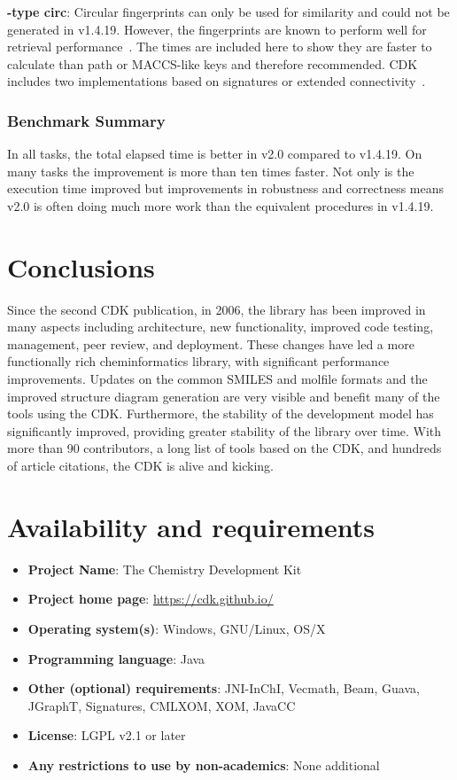 \documentclass[doublespacing]{bmcart}
\def \cdkversion {v2.0}
\begin{document}
\textbf{-type circ}: Circular fingerprints can only be used for similarity and
could not be generated in v1.4.19. However, the fingerprints are known to perform
well for retrieval performance~\cite{OBoyle2016}. The times are included here 
to show they are faster to calculate than path or MACCS-like keys and therefore
recommended. CDK includes two implementations based on signatures or extended 
connectivity~\cite{Clark2014}.

\subsubsection*{Benchmark Summary}

In all tasks, the total elapsed time is better in \cdkversion{} compared to 
v1.4.19. On many tasks the improvement is more than ten times faster.
Not only is the execution time improved but improvements in robustness and 
correctness means \cdkversion{} is often doing much more work than the 
equivalent procedures in v1.4.19.

\section*{Conclusions}

Since the second CDK publication, in 2006, the library has been improved
in many aspects including architecture, new functionality, improved
code testing, management, peer review, and deployment. These changes have led a more
functionally rich cheminformatics library, with significant
performance improvements. Updates on the common SMILES and molfile
formats and the improved structure diagram generation are very visible
and benefit many of the tools using the CDK.  Furthermore, the
stability of the development model has significantly improved,
providing greater stability of the library over time.
With more than 90 contributors, a long list of tools based on the CDK, and
hundreds of article citations, the CDK is alive and kicking.

\section*{Availability and requirements}

\begin{itemize}
\item \textbf{Project Name}: The Chemistry Development Kit
\item \textbf{Project home page}: \url{https://cdk.github.io/}
\item \textbf{Operating system(s)}: Windows, GNU/Linux, OS/X
\item \textbf{Programming language}: Java
\item \textbf{Other (optional) requirements}: JNI-InChI, Vecmath, Beam, Guava, JGraphT, Signatures, CMLXOM, XOM, JavaCC
\item \textbf{License}: LGPL v2.1 or later
\item \textbf{Any restrictions to use by non-academics}: None additional
\end{itemize}
\end{document}
